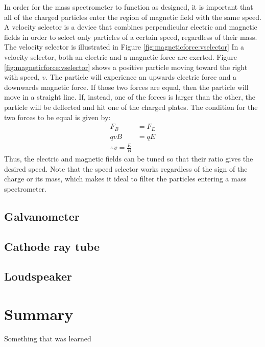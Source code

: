 In order for the mass spectrometer to function as designed, it is important that all of the charged particles enter the region of magnetic field with the same speed. A velocity selector is a device that combines perpendicular electric and magnetic fields in order to select only particles of a certain speed, regardless of their mass. The velocity selector is illustrated in Figure \ref{fig:magneticforce:vselector}
In a velocity selector, both an electric and a magnetic force are exerted. Figure \ref{fig:magneticforce:vselector} shows a positive particle moving toward the right with speed, $v$. The particle will experience an upwards electric force and a downwards magnetic force. If those two forces are equal, then the particle will move in a straight line. If, instead, one of the forces is larger than the other, the particle will be deflected and hit one of the charged plates. The condition for the two forces to be equal is given by:
\begin{align*}
F_B &= F_E\\
qvB &= qE\\
\therefore v=\frac{E}{B}
\end{align*}
Thus, the electric and magnetic fields can be tuned so that their ratio gives the desired speed. Note that the speed selector works regardless of the sign of the charge or its mass, which makes it ideal to filter the particles entering a mass spectrometer.
\subsection{Galvanometer}
\subsection{Cathode ray tube}
\subsection{Loudspeaker}
\newpage
\section{Summary}

\begin{chapterSummary}
 Something that was learned
\end{chapterSummary}

